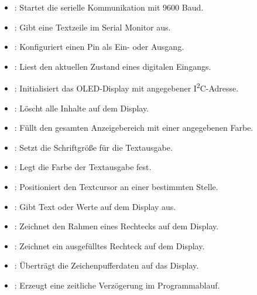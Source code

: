 \begin{itemize}
	\item {}: Startet die serielle Kommunikation mit 9600 Baud.
	
	\item {}: Gibt eine Textzeile im Serial Monitor aus.
	
	\item {}: Konfiguriert einen Pin als Ein- oder Ausgang.
	
	\item {}: Liest den aktuellen Zustand eines digitalen Eingangs.
	
	\item {}: Initialisiert das OLED-Display mit angegebener I\textsuperscript{2}C-Adresse.
	
	\item {}: Löscht alle Inhalte auf dem Display.
	
	\item {}: Füllt den gesamten Anzeigebereich mit einer angegebenen Farbe.
	
	\item {}: Setzt die Schriftgröße für die Textausgabe.
	
	\item {}: Legt die Farbe der Textausgabe fest.
	
	\item {}: Positioniert den Textcursor an einer bestimmten Stelle.
	
	\item {}: Gibt Text oder Werte auf dem Display aus.
	
	\item {}: Zeichnet den Rahmen eines Rechtecks auf dem Display.
	
	\item {}: Zeichnet ein ausgefülltes Rechteck auf dem Display.
	
	\item {}: Überträgt die Zeichenpufferdaten auf das Display.
	
	\item {}: Erzeugt eine zeitliche Verzögerung im Programmablauf.
\end{itemize}

